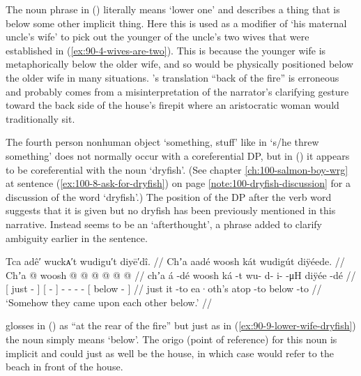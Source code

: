 The noun phrase  in (\lastx) literally means ‘lower one’ and describes a thing that is below some other implicit thing.
Here this is used as a modifier of  ‘his maternal uncle’s wife’ to pick out the younger of the uncle’s two wives that were established in (\ref{ex:90-4-wives-are-two}).
This is because the younger wife is metaphorically below the older wife, and so would be physically positioned below the older wife in many situations.
\citeauthor{swanton:1909}’s translation “back of the fire” is erroneous and probably comes from a misinterpretation of the narrator’s clarifying gesture toward the back side of the house’s firepit where an aristocratic woman would traditionally sit.

The fourth person nonhuman object  ‘something, stuff’ like in  ‘s/he threw something’ does not normally occur with a coreferential DP, but in (\lastx) it appears to be coreferential with the noun  ‘dryfish’. (See chapter \ref{ch:100-salmon-boy-wrg} at sentence (\ref{ex:100-8-ask-for-dryfish}) on page \ref{note:100-dryfish-discussion} for a discussion of the word  ‘dryfish’.) The position of the DP  after the verb word suggests that it is given but no dryfish has been previously mentioned in this narrative.
Instead  seems to be an ‘afterthought’, a phrase added to clarify ambiguity earlier in the sentence.

\ex\label{ex:90-10-somehow-encountered}%
%
\begingl
	\glpreamble	Tca adê′ wuckᴀ′t wudigu′t diyē′dî. //
	\glpreamble	Chʼa aadé woosh kát wudigút diÿéede. //
	\gla	{} Chʼa  @ {} {} 
		{} woosh  @ {} {}
		 @ {} @ {} @ {} @ {}
		{}  @ {} {} //
	\glb	{} chʼa á -dé {}
		{} woosh ká -t {}
		wu- d- i-  -μH
		{} diÿée -dé {} //
	\glc	{}[ just  - {}]
		{}[   - {}]
		- - -  -
		{}[ below - {}] //
	\gld	{} just it -to {}
		{} ea·oth’s atop -to {}
		 {} {} {} {}
		{} below -to {} //
	\glft	‘Somehow they came upon each other below.’
		//
\endgl
\xe

\citeauthor{swanton:1909} glosses  in (\lastx) as “at the rear of the fire” but just as in (\ref{ex:90-9-lower-wife-dryfish}) the noun  simply means ‘below’.
The origo (point of reference) for this noun is implicit and could just as well be the house, in which case  would refer to the beach in front of the house.

